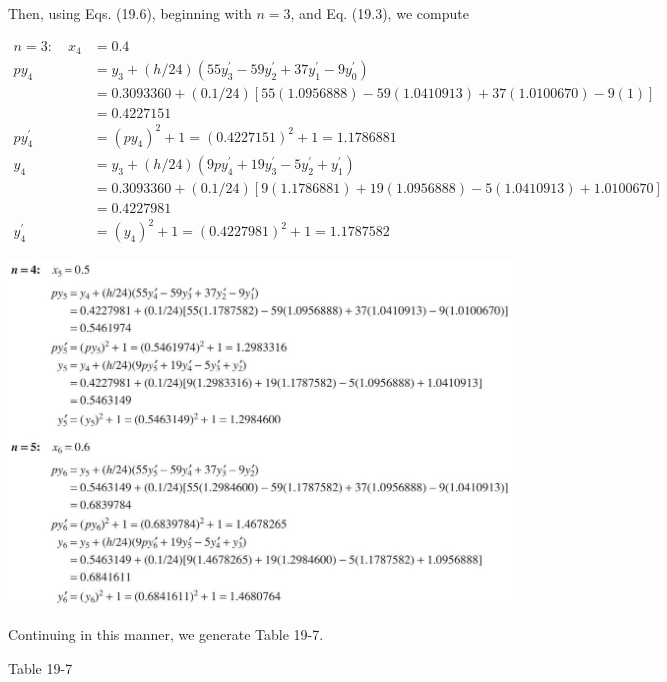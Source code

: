 \documentclass[10pt]{article}
\begin{document}
Then, using Eqs. (19.6), beginning with $n=3$, and Eq. (19.3), we compute

$$
\begin{aligned}
n=3: \quad x_{4} & =0.4 \\
p y_{4} & =y_{3}+(h / 24)\left(55 y_{3}^{\prime}-59 y_{2}^{\prime}+37 y_{1}^{\prime}-9 y_{0}^{\prime}\right) \\
& =0.3093360+(0.1 / 24)[55(1.0956888)-59(1.0410913)+37(1.0100670)-9(1)] \\
& =0.4227151 \\
p y_{4}^{\prime} & =\left(p y_{4}\right)^{2}+1=(0.4227151)^{2}+1=1.1786881 \\
y_{4} & =y_{3}+(h / 24)\left(9 p y_{4}^{\prime}+19 y_{3}^{\prime}-5 y_{2}^{\prime}+y_{1}^{\prime}\right) \\
& =0.3093360+(0.1 / 24)[9(1.1786881)+19(1.0956888)-5(1.0410913)+1.0100670] \\
& =0.4227981 \\
y_{4}^{\prime} & =\left(y_{4}\right)^{2}+1=(0.4227981)^{2}+1=1.1787582
\end{aligned}
$$

\begin{center}
\includegraphics[max width=\textwidth]{2024_04_03_5bb5b4275a64cb9887d1g-205}
\end{center}

Continuing in this manner, we generate Table 19-7.

Table 19-7
\end{document}
